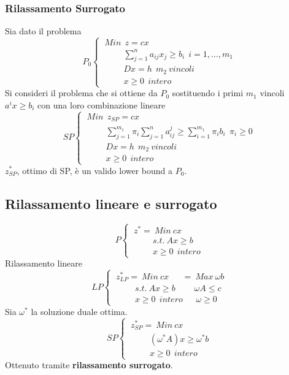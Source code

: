 \subsubsection{Rilassamento Surrogato}
Sia dato il problema
\begin{displaymath}
P_{0}
\begin{cases}
\ Min\ \ z=cx\\
\ \ \ \ \ \ \ \ \ \ \ \sum_{j=1}^{n}a_{ij}x_{j}\ge b_{i}\ \ i=1,\dots,m_{1}\\
\ \ \ \ \ \ \ \ \ \ \ Dx=h\ \ m_{2}\ vincoli\\
\ \ \ \ \ \ \ \ \ \ \ x\ge 0\ \ intero
\end{cases}
\end{displaymath}
Si consideri il problema che si ottiene da $P_{0}$ sostituendo i primi $m_{1}$ vincoli $a^{i}x\ge b_{i}$ con una loro combinazione lineare
\begin{displaymath}
SP
\begin{cases}
\ Min\ \ z_{SP}=cx\\
\ \ \ \ \ \ \ \ \ \ \ \sum_{j=1}^{m_{1}}\pi_{i}\sum_{j=1}^{n}a_{ij}^{j}\ge \sum_{i=1}^{m_{1}}\pi_{i}b_{i}\ \ \pi_{i}\ge 0\\
\ \ \ \ \ \ \ \ \ \ \ Dx=h\ \ m_{2}\ vincoli\\
\ \ \ \ \ \ \ \ \ \ \ x\ge 0\ \ intero
\end{cases}
\end{displaymath}
$z_{SP}^{*}$, ottimo di SP, è un valido lower bound a $P_{0}$.

\subsection{Rilassamento lineare e surrogato}
\begin{displaymath}
P
\begin{cases}
\ z^{*}=\ Min\ cx\\
\ \ \ \ \ \ \ \ \ \ \ s.t.\ Ax\ge b\\
\ \ \ \ \ \ \ \ \ \ \ x\ge 0\ \ intero
\end{cases}
\end{displaymath}
Rilassamento lineare
\begin{displaymath}
LP
\begin{cases}
\ z_{LP}^{*}=\ Min\ cx\ \ \ \ \ \ \ =\ Max\ \omega b\\
\ \ \ \ \ \ \ \ \ \ \ s.t.\ Ax\ge b\ \ \ \ \ \ \ \ \ \ \omega A\le c\\
\ \ \ \ \ \ \ \ \ \ \ x\ge 0\ \ intero\ \ \ \ \ \ \ \omega \ge 0
\end{cases}
\end{displaymath}
Sia $\omega^{*}$ la soluzione duale ottima.
\begin{displaymath}
SP
\begin{cases}
\ z_{SP}^{*}=\ Min\ cx\\
\ \ \ \ \ \ \ \ \ \ \ (\omega^{*}A)x\ge\omega^{*}b\\
\ \ \ \ \ \ \ \ \ \ \ x\ge 0\ \ intero
\end{cases}
\end{displaymath}
Ottenuto tramite \textbf{rilassamento surrogato}.

